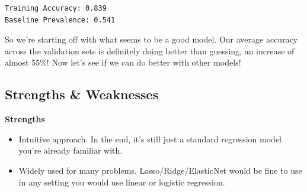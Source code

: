 \documentclass[
  letterpaper,
]{krantz}
\newenvironment{Shaded}{}{}
\newcommand{\AttributeTok}[1]{\textcolor[rgb]{0.49,0.56,0.16}{#1}}
\newcommand{\CommentTok}[1]{\textcolor[rgb]{0.38,0.63,0.69}{\textit{#1}}}
\newcommand{\DecValTok}[1]{\textcolor[rgb]{0.25,0.63,0.44}{#1}}
\newcommand{\FloatTok}[1]{\textcolor[rgb]{0.25,0.63,0.44}{#1}}
\newcommand{\FunctionTok}[1]{\textcolor[rgb]{0.02,0.16,0.49}{#1}}
\newcommand{\NormalTok}[1]{#1}
\newcommand{\OtherTok}[1]{\textcolor[rgb]{0.00,0.44,0.13}{#1}}
\newcommand{\SpecialCharTok}[1]{\textcolor[rgb]{0.25,0.44,0.63}{#1}}
\newcommand{\StringTok}[1]{\textcolor[rgb]{0.25,0.44,0.63}{#1}}
\providecommand{\tightlist}{%
  \setlength{\itemsep}{0pt}\setlength{\parskip}{0pt}}\usepackage{longtable,booktabs,array}
\begin{document}
\begin{Shaded}
\end{Shaded}

\begin{verbatim}
Training Accuracy: 0.839
Baseline Prevalence: 0.541
\end{verbatim}

So we're starting off with what seems to be a good model. Our average
accuracy across the validation sets is definitely doing better than
guessing, an increase of almost 55\%! Now let's see if we can do better
with other models!

\subsection{Strengths \& Weaknesses}\label{strengths-weaknesses}

\textbf{Strengths}

\begin{itemize}
\tightlist
\item
  Intuitive approach. In the end, it's still just a standard regression
  model you're already familiar with.
\item
  Widely used for many problems. Lasso/Ridge/ElasticNet would be fine to
  use in any setting you would use linear or logistic regression.
\end{itemize}
\end{document}
